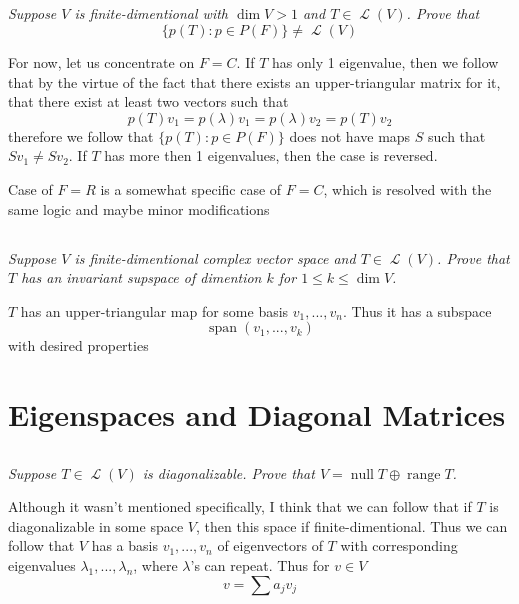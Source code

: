 \documentclass[11pt,oneside,titlepage]{book}
\DeclareMathOperator \map {\mathcal {L}}
\DeclareMathOperator \ns {null}
\DeclareMathOperator \range {range}
\DeclareMathOperator \Span {span}
\begin{document}
\subsection{}

\textit{Suppose $V$ is finite-dimentional with $\dim V > 1$ and $T \in \map(V)$. Prove
  that }
$$\{p(T): p \in P(F)\} \neq \map(V)$$

For now, let us concentrate on $F = C$. If $T$ has only 1 eigenvalue, then we follow that
by the virtue of the fact that there exists an upper-triangular matrix for it, that
there exist at least two vectors such that
$$p(T)v_1 = p(\lambda)v_1 = p(\lambda)v_2 = p(T)v_2$$
therefore we follow that $\{p(T): p \in P(F)\}$ does not have maps  $S$ such that $Sv_1 \neq Sv_2$.
If $T$ has more then 1 eigenvalues, then the case is reversed.

Case of $F = R$ is a somewhat specific case of $F = C$, which is resolved with the same logic
and maybe minor modifications

\subsection{}

\textit{Suppose $V$ is finite-dimentional complex vector space and $T \in \map(V)$. Prove
  that $T$ has an invariant supspace of dimention $k$ for $1 \leq k \leq \dim V$.}

$T$ has an upper-triangular map for some basis $v_1, ..., v_n$. Thus it has a subspace
$$\Span(v_1, ..., v_k)$$
with desired properties

\section{Eigenspaces and Diagonal Matrices}

\subsection{}

\textit{Suppose $T \in \map(V)$ is diagonalizable. Prove that $V = \ns T \oplus \range T$.}

Although it wasn't mentioned specifically, I think that we can follow that if $T$ is
diagonalizable in some space $V$, then this space if finite-dimentional. Thus we can follow that
$V$ has a basis $v_1, ..., v_n$ of eigenvectors of $T$ with corresponding eigenvalues
$\lambda_1, ..., \lambda_n$, where $\lambda$'s can repeat. Thus for $v \in V$
$$v = \sum {a_j v_j}$$
\end{document}

